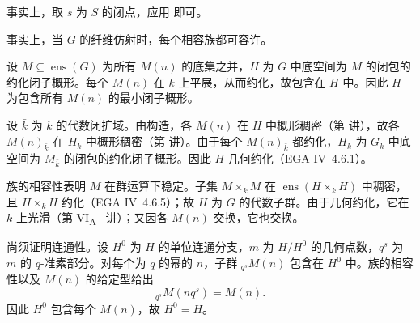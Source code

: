 事实上，取 \(s\) 为 \(S\) 的闭点，应用 即可。


事实上，当 \(G\) 的纤维仿射时，每个相容族都可容许。




设 \(M\subseteq\operatorname{ens}(G)\) 为所有 \(M(n)\) 的底集之并，\(H\) 为 \(G\) 中底空间为 \(M\) 的闭包的约化闭子概形。每个 \(M(n)\) 在 \(k\) 上平展，从而约化，故包含在 \(H\) 中。因此 \(H\) 为包含所有 \(M(n)\) 的最小闭子概形。

设 \(\bar k\) 为 \(k\) 的代数闭扩域。由构造，各 \(M(n)\) 在 \(H\) 中概形稠密（第  讲），故各 \(M(n)_{\bar k}\) 在 \(H_{\bar k}\) 中概形稠密（第  讲）。由于每个 \(M(n)_{\bar k}\) 都约化，\(H_{\bar k}\) 为 \(G_{\bar k}\) 中底空间为 \(M_{\bar k}\) 的闭包的约化闭子概形。因此 \(H\) 几何约化（EGA IV~4.6.1）。

族的相容性表明 \(M\) 在群运算下稳定。子集 \(M\times_kM\) 在 \(\operatorname{ens}(H\times_kH)\) 中稠密，且 \(H\times_kH\) 约化（EGA IV~4.6.5）；故 \(H\) 为 \(G\) 的代数子群。由于几何约化，它在 \(k\) 上光滑（第 VI\textsubscript{A}~ 讲）；又因各 \(M(n)\) 交换，它也交换。

尚须证明连通性。设 \(H^0\) 为 \(H\) 的单位连通分支，\(m\) 为 \(H/H^0\) 的几何点数，\(q^s\) 为 \(m\) 的 \(q\)-准素部分。对每个为 \(q\) 的幂的 \(n\)，子群 \({}_{q^s}M(n)\) 包含在 \(H^0\) 中。族的相容性以及 \(M(n)\) 的给定型给出
\[
  {}_{q^s}M(nq^s)=M(n).
\]
因此 \(H^0\) 包含每个 \(M(n)\)，故 \(H^0=H\)。

